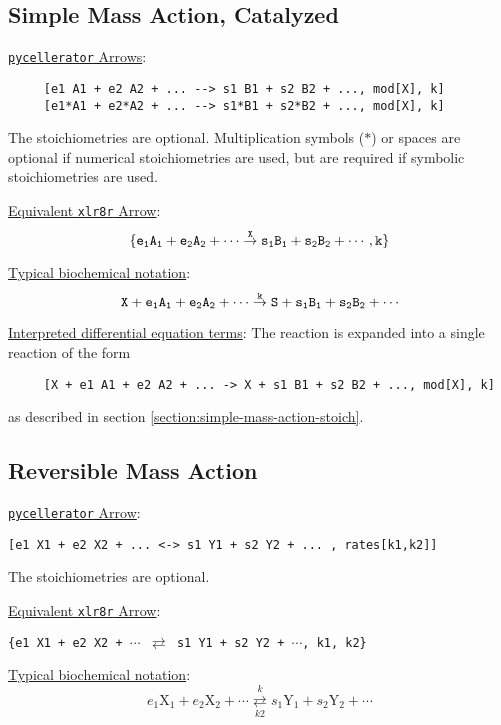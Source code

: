 \subsection{Simple Mass Action, Catalyzed}
\label{section:simple-mass-action-cat}

\underline{{\tt pycellerator} Arrows}: \begin{lstlisting}
     [e1 A1 + e2 A2 + ... --> s1 B1 + s2 B2 + ..., mod[X], k]
     [e1*A1 + e2*A2 + ... --> s1*B1 + s2*B2 + ..., mod[X], k]
\end{lstlisting} 
The stoichiometries are optional. Multiplication symbols ($*$) or spaces are optional if numerical stoichiometries are used, but are required if symbolic stoichiometries are used. 

\underline{Equivalent {\tt xlr8r} Arrow}: 
$$\tt\{e_1 A_1 + e_2 A_2 + \cdots \overset{X}{\to} s_1 B_1 + s_2 B_2 + \cdots, k\}$$

\underline{Typical biochemical notation}: $$\tt{X + e_1 A_1 + e_2 A_2 + \cdots \overset{k}{\to} S + s_1 B_1 + s_2 B_2 + \cdots}$$

\underline{Interpreted differential equation terms}: 
The reaction is expanded into a single reaction of the form 

 \begin{lstlisting}
     [X + e1 A1 + e2 A2 + ... -> X + s1 B1 + s2 B2 + ..., mod[X], k]
\end{lstlisting} 
as described in section \ref{section:simple-mass-action-stoich}.


\subsection{Reversible Mass Action}
\label{section:reversible-mass-action}


\underline{{\tt pycellerator} Arrow}: \begin{lstlisting}
[e1 X1 + e2 X2 + ... <-> s1 Y1 + s2 Y2 + ... , rates[k1,k2]] 
\end{lstlisting}
The stoichiometries are optional.

\underline{Equivalent {\tt xlr8r} Arrow}: \begin{center}
{\tt \{e1 X1 + e2 X2 + $\cdots$  $\rightleftarrows$ s1 Y1 + s2 Y2 + $\cdots$, k1, k2\}}
\end{center}
\underline{Typical biochemical notation}: $$e_1 \text{X}_1 + e_2 \text{X}_2 + \cdots \underset{k2}{\overset{k}{\rightleftarrows}} s_1\text{Y}_1 + s_2\text{Y}_2 + \cdots$$



